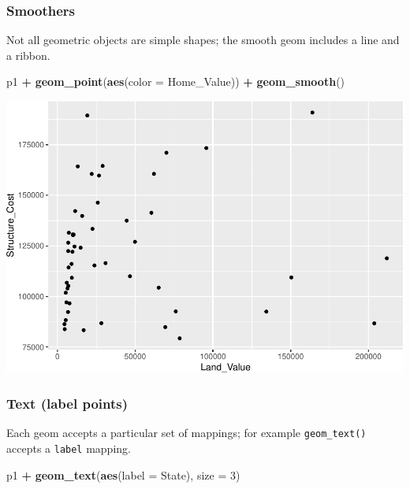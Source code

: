 \documentclass[
]{book}
\newenvironment{Shaded}{\begin{snugshade}}{\end{snugshade}}
\newcommand{\DataTypeTok}[1]{\textcolor[rgb]{0.13,0.29,0.53}{#1}}
\newcommand{\DecValTok}[1]{\textcolor[rgb]{0.00,0.00,0.81}{#1}}
\newcommand{\KeywordTok}[1]{\textcolor[rgb]{0.13,0.29,0.53}{\textbf{#1}}}
\newcommand{\NormalTok}[1]{#1}
\newcommand{\OperatorTok}[1]{\textcolor[rgb]{0.81,0.36,0.00}{\textbf{#1}}}
\newcommand{\StringTok}[1]{\textcolor[rgb]{0.31,0.60,0.02}{#1}}
\begin{document}
\hypertarget{smoothers}{%
\subsubsection{Smoothers}\label{smoothers}}

Not all geometric objects are simple shapes; the smooth geom includes a line and a ribbon.

\begin{Shaded}
\begin{Highlighting}[]
\NormalTok{p1 }\OperatorTok{+}
\StringTok{  }\KeywordTok{geom\_point}\NormalTok{(}\KeywordTok{aes}\NormalTok{(}\DataTypeTok{color =}\NormalTok{ Home\_Value)) }\OperatorTok{+}
\StringTok{  }\KeywordTok{geom\_smooth}\NormalTok{()}
\end{Highlighting}
\end{Shaded}

\includegraphics{R/Rgraphics/figures/unnamed-chunk-147-1.pdf}

\hypertarget{text-label-points}{%
\subsubsection{Text (label points)}\label{text-label-points}}

Each geom accepts a particular set of mappings; for example \texttt{geom\_text()} accepts a \texttt{label} mapping.

\begin{Shaded}
\begin{Highlighting}[]
\NormalTok{p1 }\OperatorTok{+}\StringTok{ }
\StringTok{  }\KeywordTok{geom\_text}\NormalTok{(}\KeywordTok{aes}\NormalTok{(}\DataTypeTok{label =}\NormalTok{ State), }\DataTypeTok{size =} \DecValTok{3}\NormalTok{)}
\end{Highlighting}
\end{Shaded}
\end{document}
